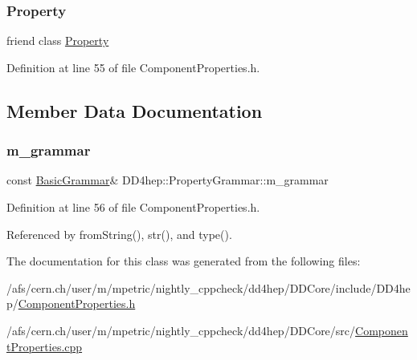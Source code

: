 \subsubsection{\texorpdfstring{Property}{Property}}
{\footnotesize\ttfamily friend class \hyperlink{class_d_d4hep_1_1_property}{Property}\hspace{0.3cm}{\ttfamily [friend]}}



Definition at line 55 of file Component\+Properties.\+h.



\subsection{Member Data Documentation}
\hypertarget{class_d_d4hep_1_1_property_grammar_a49c47d61452e560f0186eef943cf711e}{}\label{class_d_d4hep_1_1_property_grammar_a49c47d61452e560f0186eef943cf711e} 
\subsubsection{\texorpdfstring{m\+\_\+grammar}{m\_grammar}}
{\footnotesize\ttfamily const \hyperlink{class_d_d4hep_1_1_basic_grammar}{Basic\+Grammar}\& D\+D4hep\+::\+Property\+Grammar\+::m\+\_\+grammar\hspace{0.3cm}{\ttfamily [protected]}}



Definition at line 56 of file Component\+Properties.\+h.



Referenced by from\+String(), str(), and type().



The documentation for this class was generated from the following files\+:\begin{DoxyCompactItemize}
\item 
/afs/cern.\+ch/user/m/mpetric/nightly\+\_\+cppcheck/dd4hep/\+D\+D\+Core/include/\+D\+D4hep/\hyperlink{_component_properties_8h}{Component\+Properties.\+h}\item 
/afs/cern.\+ch/user/m/mpetric/nightly\+\_\+cppcheck/dd4hep/\+D\+D\+Core/src/\hyperlink{_component_properties_8cpp}{Component\+Properties.\+cpp}\end{DoxyCompactItemize}
